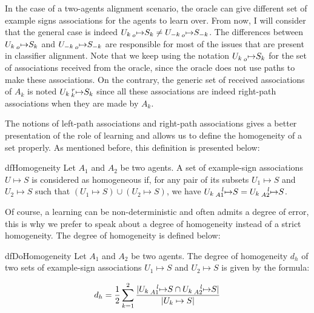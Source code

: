 In the case of a two-agents alignment scenario, the oracle can give different set of example signs associations for the agents to learn over. From now, I will consider that the general case is indeed $U_{k} \prescript{}{o}{\mapsto} S_{k} \neq U_{-k} \prescript{}{o}{\mapsto} S_{-k}$. The differences between $U_{k} \prescript{}{o}{\mapsto} S_{k}$ and $U_{-k} \prescript{}{o}{\mapsto} S_{-k}$ are responsible for most of the issues that are present in classifier alignment. Note that we keep using the notation  $U_{k} \prescript{}{o}{\mapsto} S_{k}$ for the set of associations received from the oracle, since the oracle does not use paths to make these associations. On the contrary, the generic set of received associations of $A_{k}$ is noted $U_{k} \prescript{r}{k}{\mapsto} S_{k}$ since all these associations are indeed right-path associations when they are made by $A_{k}$.

The notions of left-path associations and right-path associations gives a better presentation of the role of learning and allows us to define the homogeneity of a set properly. As mentioned before, this definition is presented below:

\begin{restatable}[Homogeneity]{df}{Homogeneity}
\label{def:Homogeneity}
Let $A_{1}$ and $A_{2}$ be two agents. A set of example-sign associations $U \mapsto S$ is considered as homogeneous if, for any pair of its subsets $U_{1} \mapsto S$ and $U_{2}\mapsto S$ such that $(U_{1} \mapsto S) \cup (U_{2} \mapsto S)$, we have $U_{k} \prescript{l}{A1}{\mapsto} S = U_{k} \prescript{l}{A2}{\mapsto} S$.
\end{restatable}

Of course, a learning can be non-deterministic and often admits a degree of error, this is why we prefer to speak about a degree of homogeneity instead of a strict homogeneity. The degree of homogeneity is defined below:

\begin{restatable}{df}{DoHomogeneity}
Let $A_{1}$ and $A_{2}$ be two agents. The degree of homogeneity $d_{h}$ of two sets of example-sign associations $U_{1} \mapsto S$ and $U_{2} \mapsto S$ is given by the formula:

\[
d_{h} = \frac{1}{2} \sum_{k = 1}^{2} \frac{|U_{k} \prescript{l}{A1}{\mapsto} S \cap U_{k} \prescript{l}{A2}{\mapsto} S|}{|U_{k} \mapsto S|}
\]

\end{restatable}

